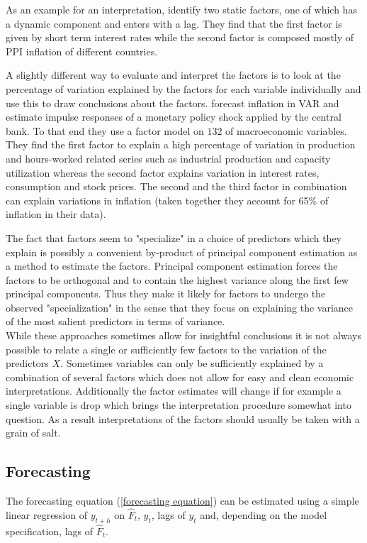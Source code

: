 \documentclass[12pt]{article}
\begin{document}
As an example for an interpretation, \citet{breitung2004identification} identify two static factors, one of which has a dynamic component and enters with a lag. They find that the first factor is given by short term interest rates while the second factor is composed mostly of PPI inflation of different countries.

A slightly different way to evaluate and interpret the factors is to look at the percentage of variation explained by the factors for each variable individually and use this to draw conclusions about the factors. \citet{stock2005implications} forecast inflation in VAR and estimate impulse responses of a monetary policy shock applied by the central bank. To that end they use a factor model on $132$ of macroeconomic variables. They find the first factor to explain a high percentage of variation in production and hours-worked related series such as industrial production and capacity utilization whereas the second factor explains variation in interest rates, consumption and stock prices. The second and the third factor in combination can explain variations in inflation (taken together they account for 65\% of inflation in their data).

The fact that factors seem to "specialize" in a choice of predictors which they explain is possibly a convenient by-product of principal component estimation as a method to estimate the factors. Principal component estimation forces the factors to be orthogonal and to contain the highest variance along the first few principal components. Thus they make it likely for factors to undergo the observed "specialization" in the sense that they focus on explaining the variance of the most salient predictors in terms of variance. \\

While these approaches sometimes allow for insightful conclusions it is not always possible to relate a single or sufficiently few factors to the variation of the predictors $X$. Sometimes variables can only be sufficiently explained by a combination of several factors which does not allow for easy and clean economic interpretations. Additionally the factor estimates will change if for example a single variable is drop which brings the interpretation procedure somewhat into question. As a result interpretations of the factors should usually be taken with a grain of salt.


\subsection{Forecasting}
The forecasting equation (\ref{forecasting equation}) can be estimated using a simple linear regression of $y_{t+h}$ on $\hat F_t$, $y_t$, lags of $y_t$ and, depending on the model specification, lags of $\hat F_t$.
\end{document}
